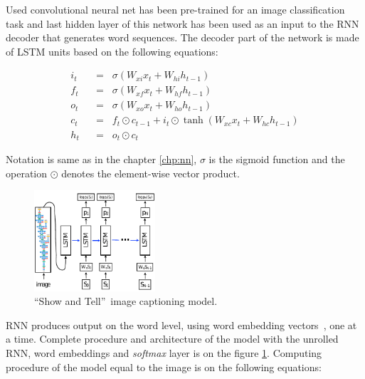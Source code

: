 Used convolutional neural net has been pre-trained for an image classification task and last hidden layer of this network has been used as an input to the RNN decoder that generates word sequences. The decoder part of the network is made of LSTM units based on the following equations:

\belowdisplayskip=24pt
\begin{align}
i_t \hspace{7pt}&=\hspace{7pt} \sigma(W_{xi}x_t + W_{hi}h_{t-1}) \label{eq:showlstm1}\\
f_t \hspace{7pt}&=\hspace{7pt} \sigma(W_{xf}x_t + W_{hf}h_{t-1}) \label{eq:showlstm2}\\
o_t \hspace{7pt}&=\hspace{7pt} \sigma(W_{xo}x_t + W_{ho}h_{t-1}) \label{eq:showlstm3}\\
c_t \hspace{7pt}&=\hspace{7pt} f_t\odot c_{t-1} + i_t\odot\tanh(W_{xc}x_t + W_{hc}h_{t-1}) \label{eq:showlstm4}\\
h_t \hspace{7pt}&=\hspace{7pt} o_t\odot c_t \label{eq:showlstm5}
\end{align}

Notation is same as in the chapter \ref{chp:nn}, $ \sigma $ is the sigmoid function and the operation $ \odot $ denotes the element-wise vector product.

\begin{figure}[!t]
	\centering
	\includegraphics[width=0.4\textwidth]{./fig/show-tell_model.pdf}
	\caption{\textquotedblleft Show and Tell\textquotedblright\ image captioning model.~\cite{DBLP:journals/corr/VinyalsTBE14}
		\label{fig:showmodel}}
\end{figure}

RNN produces output on the word level, using word embedding vectors~\cite{DBLP:journals/corr/abs-1301-3781}, one at a time. Complete procedure and architecture of the model with the unrolled RNN, word embeddings and \emph{softmax} layer is on the figure \ref{fig:showmodel}. Computing procedure of the model equal to the image is on the following equations:

